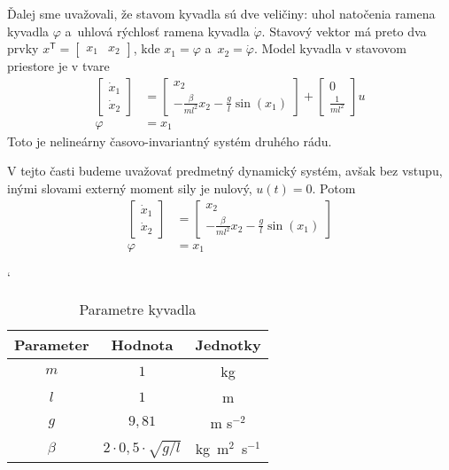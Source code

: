 \documentclass[a4paper, 10pt, ]{article}
\begin{document}
Ďalej sme uvažovali, že stavom kyvadla sú dve veličiny: uhol natočenia ramena kyvadla $\varphi$ a~uhlová rýchlosť ramena kyvadla $\dot\varphi$. Stavový vektor má preto dva prvky $x^{\mathsf{T}} = \begin{bmatrix} x_1 & x_2	\end{bmatrix}$, kde $x_1 = \varphi$ a~$x_2 = \dot\varphi$. Model kyvadla v stavovom priestore je v tvare
\begin{subequations}
	\begin{align}
		\begin{bmatrix}
			\dot{x}_1 \\ \dot{x}_2
		\end{bmatrix}
		&=
		\begin{bmatrix}
			x_2 \\ - \frac{\beta}{ml^2} x_2 - \frac{g}{l} \sin(x_1)
		\end{bmatrix}
		+
		\begin{bmatrix}
			0 \\ \frac{1}{ml^2}
		\end{bmatrix}
		u \\
		\varphi &= x_1
	\end{align}
\end{subequations}
Toto je nelineárny časovo-invariantný systém druhého rádu.


V tejto časti budeme uvažovať predmetný dynamický systém, avšak bez vstupu, inými slovami externý moment sily je nulový, $u(t) = 0$. Potom
\begin{subequations}
	\begin{align} \label{fajnVektRov}
		\begin{bmatrix}
			\dot{x}_1 \\ \dot{x}_2
		\end{bmatrix}
		&=
		\begin{bmatrix}
			x_2 \\ - \frac{\beta}{ml^2} x_2 - \frac{g}{l} \sin(x_1)
		\end{bmatrix}
 \\
		\varphi &= x_1
	\end{align}
\end{subequations}





\begin{table}[b]
	\centering
	\catcode`

\caption{Parametre kyvadla}
\label{Parametre kyvadla}
\begin{tabular}{     c    c   c       }
\toprule
Parameter   & Hodnota    & Jednotky              \\
\midrule
$m$       & $1$   & kg             \\
$l$    &  $1$  & m \\
$g$   & $9,81$  & m s$^{-2}$ \\
$\beta$  &  $2 \cdot 0,5 \cdot \sqrt{g/l}$ &  kg~m$^2$~s$^{-1}$ \\
\bottomrule
\end{tabular}
\end{table}
\end{document}
